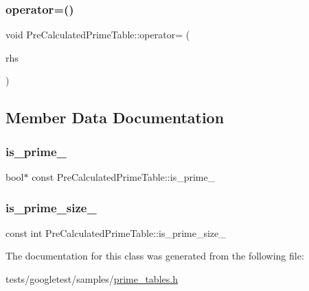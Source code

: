 \subsubsection{\texorpdfstring{operator=()}{operator=()}}
{\footnotesize\ttfamily void Pre\+Calculated\+Prime\+Table\+::operator= (\begin{DoxyParamCaption}\item[{const \hyperlink{classPreCalculatedPrimeTable}{Pre\+Calculated\+Prime\+Table} \&}]{rhs }\end{DoxyParamCaption})\hspace{0.3cm}{\ttfamily [private]}}



\subsection{Member Data Documentation}
\mbox{\label{classPreCalculatedPrimeTable_ac393ebf41a32b3cba39fe67f7aa5fa38}} 
\subsubsection{\texorpdfstring{is\+\_\+prime\+\_\+}{is\_prime\_}}
{\footnotesize\ttfamily bool$\ast$ const Pre\+Calculated\+Prime\+Table\+::is\+\_\+prime\+\_\+\hspace{0.3cm}{\ttfamily [private]}}

\mbox{\label{classPreCalculatedPrimeTable_ad4275df41c5e5be3cad8c5abeaad1ac6}} 
\subsubsection{\texorpdfstring{is\+\_\+prime\+\_\+size\+\_\+}{is\_prime\_size\_}}
{\footnotesize\ttfamily const int Pre\+Calculated\+Prime\+Table\+::is\+\_\+prime\+\_\+size\+\_\+\hspace{0.3cm}{\ttfamily [private]}}



The documentation for this class was generated from the following file\+:\begin{DoxyCompactItemize}
\item 
tests/googletest/samples/\hyperlink{prime__tables_8h}{prime\+\_\+tables.\+h}\end{DoxyCompactItemize}
